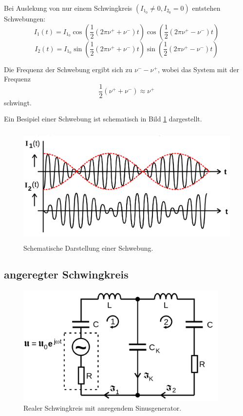 Bei Auslekung von nur einem Schwingkreis $(I_{1_0}\neq 0,I_{2_0}=0)$ entstehen Schwebungen:
\begin{equation}
    I_1(t)=I_{1_0}\cos(\frac{1}{2}\left(2\pi\nu^++\nu^-\right)t)\cos(\frac{1}{2}\left(2\pi\nu^+-\nu^-\right)t)
\end{equation}
\begin{equation}
    I_2(t)=I_{1_0}\sin(\frac{1}{2}\left(2\pi\nu^++\nu^-\right)t)\sin(\frac{1}{2}\left(2\pi\nu^+-\nu^-\right)t)
\end{equation}

Die Frequenz der Schwebung ergibt sich zu $\nu^--\nu^+$, wobei das System mit der Frequenz
\begin{equation}
    \frac{1}{2}(\nu^++\nu^-)\approx \nu^+
\end{equation}
schwingt.

Ein Besipiel einer Schwebung ist schematisch in Bild \ref{fig:bild3} dargestellt.
\begin{figure}
\label{fig:bild3}
    \centering
    \includegraphics[height=6.0cm]{data/Bild3.png}
    \caption{Schematische Darstellung einer Schwebung.}
\end{figure}

\subsection{angeregter Schwingkreis}

\begin{figure}
\label{fig:bild4}
    \centering
    \includegraphics[height=6.0cm]{data/Bild4.png}
    \caption{Realer Schwingkreis mit anregendem Sinusgenerator.}
\end{figure}

